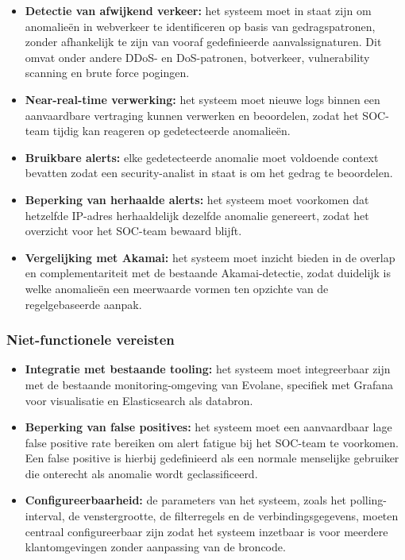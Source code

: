 \begin{itemize}
    \item \textbf{Detectie van afwijkend verkeer:} het systeem moet in staat zijn om anomalieën in webverkeer te identificeren op basis van gedragspatronen, zonder afhankelijk te zijn van vooraf gedefinieerde aanvalssignaturen. Dit omvat onder andere DDoS- en DoS-patronen, botverkeer, vulnerability scanning en brute force pogingen.
    \item \textbf{Near-real-time verwerking:} het systeem moet nieuwe logs binnen een aanvaardbare vertraging kunnen verwerken en beoordelen, zodat het SOC-team tijdig kan reageren op gedetecteerde anomalieën.
    \item \textbf{Bruikbare alerts:} elke gedetecteerde anomalie moet voldoende context bevatten zodat een security-analist in staat is om het gedrag te beoordelen. 
    \item \textbf{Beperking van herhaalde alerts:} het systeem moet voorkomen dat hetzelfde IP-adres herhaaldelijk dezelfde anomalie genereert, zodat het overzicht voor het SOC-team bewaard blijft.
    \item \textbf{Vergelijking met Akamai:} het systeem moet inzicht bieden in de overlap en complementariteit met de bestaande Akamai-detectie, zodat duidelijk is welke anomalieën een meerwaarde vormen ten opzichte van de regelgebaseerde aanpak.
\end{itemize}
 
\subsubsection{Niet-functionele vereisten}
 
\begin{itemize}
    \item \textbf{Integratie met bestaande tooling:} het systeem moet integreerbaar zijn met de bestaande monitoring-omgeving van Evolane, specifiek met Grafana voor visualisatie en Elasticsearch als databron.
    \item \textbf{Beperking van false positives:} het systeem moet een aanvaardbaar lage false positive rate bereiken om alert fatigue bij het SOC-team te voorkomen. Een false positive is hierbij gedefinieerd als een normale menselijke gebruiker die onterecht als anomalie wordt geclassificeerd.
    \item \textbf{Configureerbaarheid:} de parameters van het systeem, zoals het polling-interval, de venstergrootte, de filterregels en de verbindingsgegevens, moeten centraal configureerbaar zijn zodat het systeem inzetbaar is voor meerdere klantomgevingen zonder aanpassing van de broncode.
\end{itemize}

